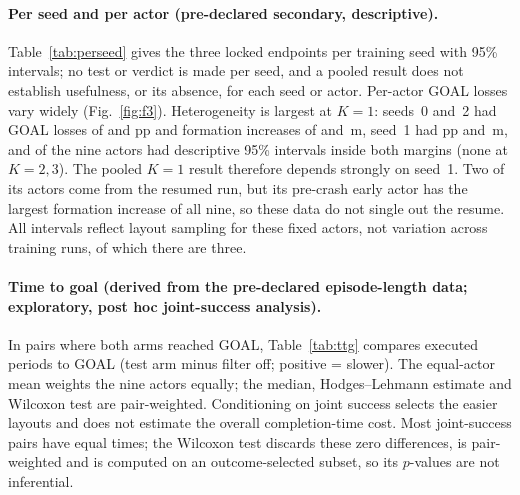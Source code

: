 \documentclass[11pt]{article}
\begin{document}
\paragraph{Per seed and per actor (pre-declared secondary, descriptive).} Table~\ref{tab:perseed}
gives the three locked endpoints per training seed with 95\% intervals; no test or verdict is made
per seed, and a pooled result does not establish usefulness, or its absence, for each seed or actor.
Per-actor GOAL losses vary widely (Fig.~\ref{fig:f3}). Heterogeneity is largest at $K=1$: seeds~0
and~2 had GOAL losses of \GLossSeedZeroone{} and \GLossSeedTwoone{} pp and formation increases of
\FormSeedZeroone{} and \FormSeedTwoone\,m, seed~1 had \GLossSeedOneone{} pp and \FormSeedOneone\,m, and
\ActorsInMarginsone{} of the nine actors had descriptive 95\% intervals inside both margins (none at
$K=2,3$). The pooled $K=1$ result therefore depends strongly on seed~1. Two of its actors come from the
resumed run, but its pre-crash early actor has the largest formation increase of all nine, so these data
do not single out the resume. All intervals reflect layout sampling for these fixed actors, not
variation across training runs, of which there are three.

\begin{table}[t]
\centering\small
\caption{Locked endpoints per training seed (pre-declared secondary, descriptive; three actors and 3{,}000
pairs per row; 95\% intervals; no tests).}
\label{tab:perseed}
\end{table}

\paragraph{Time to goal (derived from the pre-declared episode-length data; exploratory, post hoc
joint-success analysis).} In pairs where both arms reached GOAL, Table~\ref{tab:ttg} compares executed periods to
GOAL (test arm minus filter off; positive = slower). The equal-actor mean weights the nine actors
equally; the median, Hodges--Lehmann estimate and Wilcoxon test are pair-weighted. Conditioning on
joint success selects the easier layouts and does not estimate the overall completion-time cost. Most
joint-success pairs have equal times; the Wilcoxon test discards these zero differences, is
pair-weighted and is computed on an outcome-selected subset, so its $p$-values are not inferential.
\end{document}
